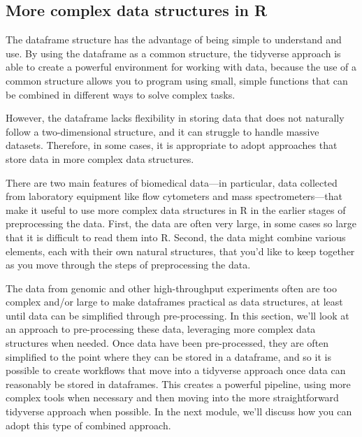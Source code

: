 \documentclass[]{tufte-book}
\begin{document}
\hypertarget{more-complex-data-structures-in-r}{%
\subsection{More complex data structures in R}\label{more-complex-data-structures-in-r}}

The dataframe structure has the advantage of being simple to understand and use.
By using the dataframe as a common structure, the tidyverse approach is able to
create a powerful environment for working with data, because the use of a common
structure allows you to program using small, simple functions that can be
combined in different ways to solve complex tasks.

However, the dataframe lacks flexibility in storing data that does not naturally
follow a two-dimensional structure, and it can struggle to handle massive datasets.
Therefore, in some cases, it is appropriate to adopt approaches that store data
in more complex data structures.

There are two main features of biomedical data---in particular, data collected
from laboratory equipment like flow cytometers and mass spectrometers---that
make it useful to use more complex data structures in R in the earlier stages of
preprocessing the data. First, the data are often very large, in some cases so
large that it is difficult to read them into R. Second, the data might combine
various elements, each with their own natural structures, that you'd like to
keep together as you move through the steps of preprocessing the data.

The data from genomic and other high-throughput experiments
often are too complex and/or large to make dataframes practical as data
structures, at least until data can be simplified through pre-processing.
In this section, we'll look at an approach to pre-processing these data, leveraging
more complex data structures when needed. Once data have been pre-processed,
they are often simplified to the point where they can be stored in a dataframe,
and so it is possible to create workflows that move into a tidyverse approach
once data can reasonably be stored in dataframes. This creates a powerful pipeline,
using more complex tools when necessary and then moving into the more
straightforward tidyverse approach when possible. In the next module, we'll
discuss how you can adopt this type of combined approach.
\end{document}
